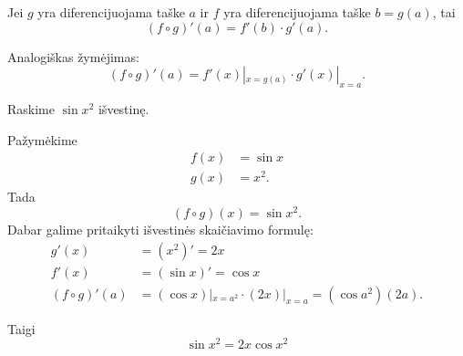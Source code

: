 \begin{prop}
  Jei $g$ yra diferencijuojama taške $a$ ir $f$ yra diferencijuojama 
  taške $b = g(a)$, tai
  \begin{equation*}
    (f \circ g)'(a) = f'(b) \cdot g'(a).
  \end{equation*}

  Analogiškas žymėjimas:
  \begin{equation*}
    (f \circ g)'(a) = f'(x)|_{x = g(a)} \cdot g'(x)|_{x = a}.
  \end{equation*}
\end{prop}

\begin{exmp}
  Raskime $\sin x^{2}$ išvestinę.

  Pažymėkime
  \begin{align*}
    f(x) &= \sin x \\
    g(x) &= x^{2}.
  \end{align*}
  Tada 
  \begin{equation*}
    (f \circ g)(x) = \sin x^{2}.
  \end{equation*}
  Dabar galime pritaikyti išvestinės skaičiavimo formulę:
  \begin{align*}
    g'(x) &= (x^{2})' = 2x \\
    f'(x) &= (\sin x)' = \cos x \\
    (f \circ g)'(a) &= (\cos x)|_{x = a^{2}} \cdot (2x)|_{x=a} 
      = (\cos a^2)(2a).
  \end{align*}

  Taigi
  \begin{equation*}
    \sin x^{2} = 2x \cos x^{2}
  \end{equation*}

\end{exmp}
